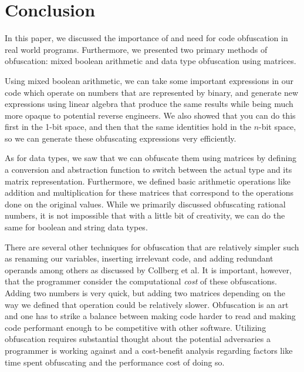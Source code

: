 \section{Conclusion}
In this paper, we discussed the importance of and need for code
obfuscation in real world programs. Furthermore, we presented two primary
methods of obfuscation: mixed boolean arithmetic and data type obfuscation
using matrices.

Using mixed boolean arithmetic, we can take some important expressions in our code
which operate on numbers that are represented by binary, and generate new expressions
using linear algebra
that produce the same results while being much more opaque to potential reverse 
engineers. We also showed that you can do this first in the 1-bit space, and then
that the same identities hold in the $n$-bit space, so we can generate these
obfuscating expressions very efficiently.

As for data types, we saw that we can obfuscate them using matrices by defining
a conversion and abstraction function to switch between the actual type and its
matrix representation. Furthermore, we defined basic arithmetic operations like
addition and multiplication for these matrices that correspond to the
operations done on the original values. While we primarily discussed
obfuscating rational numbers, it is not impossible that with a little bit of
creativity, we can do the same for boolean and string data types.

There are several other techniques for obfuscation that are relatively simpler
such as renaming our variables, inserting irrelevant code, and adding redundant
operands among others as discussed by Collberg et al. It is important, however,
that the programmer consider the computational \textit{cost} of these
obfuscations. Adding two numbers is very quick, but adding two matrices
depending on the way we defined that operation could be relatively slower.
Obfuscation is an art and one has to strike a balance between making code
harder to read and making code performant enough to be competitive with other
software. Utilizing obfuscation requires substantial thought about the potential
adversaries a programmer is working against and a cost-benefit analysis regarding
factors like time spent obfuscating and the performance cost of doing so.
